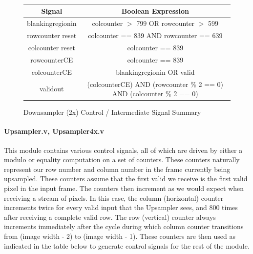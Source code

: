\documentclass[12pt]{article}
\begin{document}
\begin{figure}
    \begingroup
    \tiny

\caption{ Downsampler (2x) Control / Intermediate Signal Summary } \label{wrap-tab:2}
\noindent \begin{tabular}{ c | c } \toprule
Signal & Boolean Expression \\\toprule
blankingregionin & colcounter $>$ 799 OR rowcounter $>$ 599 \\
rowcounter reset & colcounter == 839 AND rowcounter == 639 \\
colcounter reset & colcounter == 839 \\
rowcounterCE & colcounter == 839 \\
colcounterCE & blankingregionin OR valid \\
validout & (colcounterCE) AND (rowcounter \% 2 == 0) AND (colcounter \% 2 == 0) \\
\end{tabular}

\endgroup
\end{figure}

\paragraph{Upsampler.v, Upsampler4x.v}
This module contains various control signals, all of which are driven by either
a modulo or equality computation on a set of counters. These counters naturally
represent our row number and column number in the frame currently being upsampled. 
These counters assume that the first valid we receive is the first valid pixel in the 
input frame. The counters then increment as we would expect when receiving a stream
of pixels. In this case, the column (horizontal) counter increments twice for
every valid input that the Upsampler sees, and 800 times after receiving a complete
valid row. The row (vertical) counter always increments immediately after the
cycle during which column counter transitions from (image width - 2) to (image width - 1).
These counters are then used as indicated in the table below to generate control
signals for the rest of the module.
\end{document}
